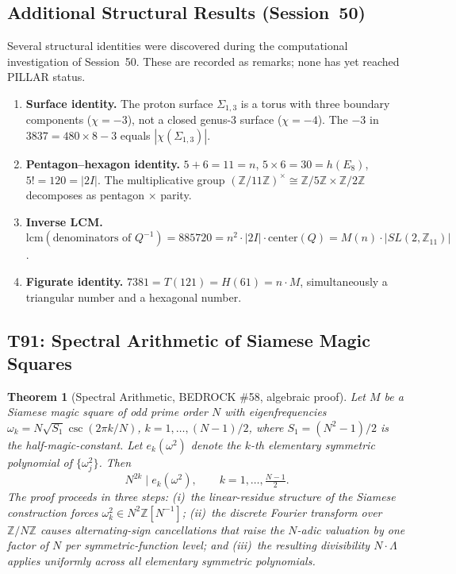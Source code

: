 \documentclass[aps,prd,twocolumn,superscriptaddress,floatfix,nofootinbib]{revtex4-2}
\newtheorem{theorem}{Theorem}
\theoremstyle{definition}
\theoremstyle{remark}
\begin{document}
\subsection{Additional Structural Results (Session~50)}
\label{sec:session50-structural}

Several structural identities were discovered during the computational
investigation of Session~50.  These are recorded as remarks; none has
yet reached PILLAR status.

\begin{enumerate}

\item \textbf{Surface identity.}  The proton surface $\Sigma_{1,3}$ is a
torus with three boundary components ($\chi = -3$), not a closed genus-3
surface ($\chi = -4$).  The $-3$ in $3837 = 480 \times 8 - 3$ equals
$|\chi(\Sigma_{1,3})|$.

\item \textbf{Pentagon--hexagon identity.}  $5 + 6 = 11 = n$,\;
$5 \times 6 = 30 = h(E_8)$,\; $5! = 120 = |2I|$.  The multiplicative
group $(\mathbb{Z}/11\mathbb{Z})^{\times} \cong \mathbb{Z}/5\mathbb{Z}
\times \mathbb{Z}/2\mathbb{Z}$ decomposes as pentagon $\times$ parity.

\item \textbf{Inverse LCM.}
$\mathrm{lcm}(\text{denominators of }Q^{-1}) = 885720
= n^{2} \cdot |2I| \cdot \mathrm{center}(Q)
= M(n) \cdot |SL(2,\mathbb{Z}_{11})|$.

\item \textbf{Figurate identity.}  $7381 = T(121) = H(61) = n \cdot M$,
simultaneously a triangular number and a hexagonal number.

\end{enumerate}

\subsection{T91: Spectral Arithmetic of Siamese Magic Squares}
\label{sec:t91-spectral-arithmetic}

\begin{theorem}[Spectral Arithmetic, BEDROCK \#58, algebraic proof]
\label{thm:t91}
Let $M$ be a Siamese magic square of odd prime order $N$ with eigenfrequencies
$\omega_k = N\sqrt{S_1}\csc(2\pi k/N)$, $k = 1,\ldots,(N-1)/2$, where
$S_1 = (N^2-1)/2$ is the half-magic-constant.  Let $e_k(\omega^2)$ denote
the $k$-th elementary symmetric polynomial of $\{\omega_j^2\}$.  Then
\[
N^{2k} \mid e_k(\omega^2), \qquad k = 1,\ldots,\tfrac{N-1}{2}.
\]
The proof proceeds in three steps: (i)~the linear-residue structure of the
Siamese construction forces $\omega_k^2 \in N^2\mathbb{Z}[N^{-1}]$;
(ii)~the discrete Fourier transform over $\mathbb{Z}/N\mathbb{Z}$ causes
alternating-sign cancellations that raise the $N$-adic valuation by one
factor of $N$ per symmetric-function level; and (iii)~the resulting
divisibility $N \cdot \Lambda$ applies uniformly across all elementary
symmetric polynomials.
\end{theorem}
\end{document}
